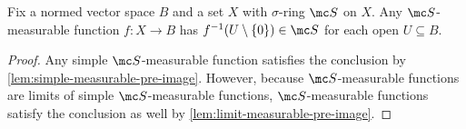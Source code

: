 \documentclass[../notes.tex]{subfiles}
\begin{document}
\begin{corollary} \label{cor:meas-has-meas-pre-image}
	Fix a normed vector space $B$ and a set $X$ with $\sigma$-ring $\mc S$ on $X$. Any $\mc S$-measurable function $f\colon X\to B$ has $f^{-1}(U\setminus\{0\})\in\mc S$ for each open $U\subseteq B$.
\end{corollary}
\begin{proof}
	Any simple $\mc S$-measurable function satisfies the conclusion by \autoref{lem:simple-measurable-pre-image}. However, because $\mc S$-measurable functions are limits of simple $\mc S$-measurable functions, $\mc S$-measurable functions satisfy the conclusion as well by \autoref{lem:limit-measurable-pre-image}.
\end{proof}
\end{document}
